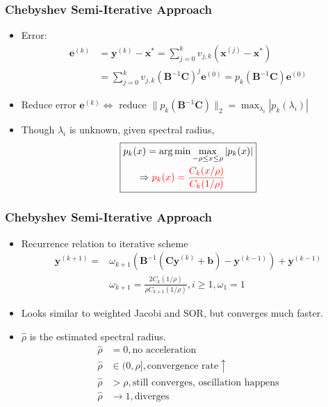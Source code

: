\documentclass[serif,mathserif]{beamer}
\newcommand{\BOLD}[1]{\mathbf{#1}}
\newcommand{\TODO}[1]{\textcolor{red}{#1}}
\newcommand{\argmin}{\operatornamewithlimits{arg\min}}
\begin{document}
\begin{frame}
 \frametitle{Chebyshev Semi-Iterative Approach}
 \begin{itemize}
  \item Error:
  \begin{equation*}
  \begin{split}
   \BOLD{e}^{(k)} &= \BOLD{y}^{(k)}-\BOLD{x}^*=\sum_{j=0}^k v_{j, k}(\BOLD{x}^{(j)}-\BOLD{x}^*) \\
   &= \sum_{j=0}^kv_{j, k}(\BOLD{B}^{-1}\BOLD{C})^j\BOLD{e}^{(0)} = p_k(\BOLD{B}^{-1}\BOLD{C})\BOLD{e}^{(0)}
  \end{split}
  \end{equation*}
  \item Reduce error $\BOLD{e}^{(k)} \Leftrightarrow$ reduce $\|p_k(\BOLD{B}^{-1}\BOLD{C})\|_2 = \max_{\lambda_i}|p_k(\lambda_i)|$
  \item Though $\lambda_i$ is unknown, given spectral radius,
  \begin{equation*}
  \boxed {
  \begin{split}
   p_k(&x) = \argmin { \max_{-\rho \le x \le \rho}|p_k(x)|} \\
    &\Rightarrow \TODO{p_k(x) = \frac{C_k(x/\rho)}{C_k(1/\rho)}}
  \end{split}
  }
  \end{equation*}
 \end{itemize}
\end{frame}

\begin{frame}
 \frametitle{Chebyshev Semi-Iterative Approach}
 \begin{itemize}
  \item Recurrence relation to iterative scheme
  \begin{equation*}
   \begin{split}
    \BOLD{y}^{(k+1)} = &\omega_{k+1}(\BOLD{B}^{-1}(\BOLD{Cy}^{(k)}+\BOLD{b})-\BOLD{y}^{(k-1)})+\BOLD{y}^{(k-1)} \\
    &\omega_{k+1} = \frac{2C_k(1/\rho)}{\rho C_{k+1}(1/\rho)}, i \ge 1, \omega_1 = 1
   \end{split}
  \end{equation*}
  \pause
  \item Looks similar to weighted Jacobi and SOR, but converges much faster.
  \pause
  \item $\hat \rho$ is the estimated spectral radius.
  \begin{equation*}
   \begin{split}
    \hat \rho &= 0, \text{no acceleration} \\
    \hat \rho &\in (0, \rho], \text{convergence rate} \uparrow \\
    \hat \rho &> \rho, \text{still converges, oscillation happens} \\
    \hat \rho &\rightarrow 1, \text{diverges}
   \end{split}
  \end{equation*}
 \end{itemize}
\end{frame}
\end{document}

